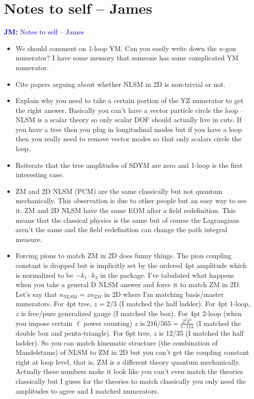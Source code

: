 \documentclass[11pt,letter]{article}
\newcommand{\jm}[1]{\textcolor{blue}{\textbf{JM: }{#1}}}
\begin{document}
\section{Notes to self -- James}
\jm{Notes to self -- James}
\begin{itemize}
\item We should comment on 1-loop YM.  Can you easily write down the $n$-gon numerator?  I have some memory that someone has some complicated YM numerator.
\item Cite papers arguing about whether NLSM in 2D is non-trivial or not.
\item Explain why you need to take a certain portion of the YZ numerator to get the right answer.  Basically you can't have a vector particle circle the loop -- NLSM is a scalar theory so only scalar DOF should actually live in cuts.  If you have a tree then you plug in longitudinal modes but if you have a loop then you really need to remove vector modes so that only scalars circle the loop.
\item Reiterate that the tree amplitudes of SDYM are zero and 1-loop is the first interesting case.
\item ZM and 2D NLSM (PCM) are the same classically but not quantum mechanically.
This observation is due to other people but an easy way to see it.
ZM and 2D NLSM have the same EOM after a field redefinition.
This means that the classical physics is the same but of course the Lagrangians aren't the same and the field redefinition can change the path integral measure.
\item Forcing pions to match ZM in 2D does funny things.
The pion coupling constant is dropped but is implicitly set by the ordered 4pt amplitude which is normalized to be $-k_1 \cdot k_3$ in the package.
I've tabulated what happens when you take a general D NLSM answer and force it to match ZM in 2D.
Let's say that $n_\text{NLSM} = z n_\text{ZM}$ in 2D where I'm matching basis/master numerators.
For 4pt tree, $z=2/3$ (I matched the half ladder).
For 4pt 1-loop, $z$ is free/pure generalized gauge (I matched the box).
For 4pt 2-loop (when you impose certain $\ell$ power counting) $z$ is $216/565=\tfrac{2^3 3^3}{5 \cdot 113}$ (I matched the double box and penta-triangle).
For 6pt tree, $z$ is 12/35 (I matched the half ladder).
So you can match kinematic structure (the combination of Mandelstams) of NLSM to ZM in 2D but you can't get the coupling constant right at loop level, that is, ZM is a different theory quantum mechanically.
Actually these numbers make it look like you can't even match the theories classically but I guess for the theories to match classically you only need the amplitudes to agree and I matched numerators.

\end{itemize}
\end{document}
